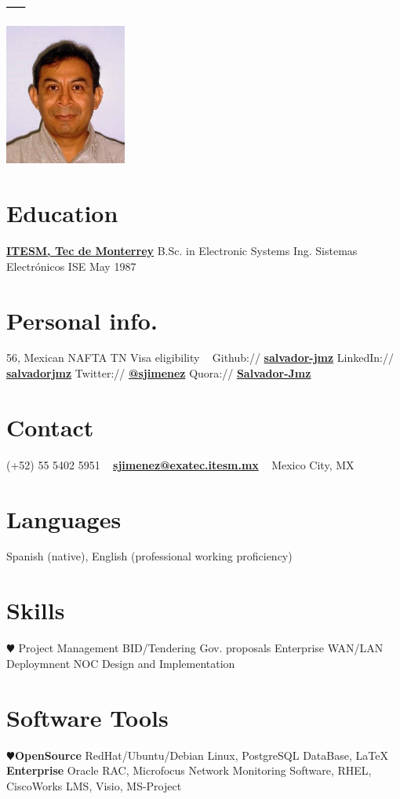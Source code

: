 \documentclass[espanol]{cv-style}     %
\begin{document}
\lastupdated

\begin{aside}
\section{\_}
\includegraphics[width=4cm]{SJS_2007.jpg}
%
\section{Education}
\href{https://tec.mx/en}{\bf ITESM, Tec de Monterrey}
B.Sc. in Electronic Systems
Ing. Sistemas Electrónicos ISE
May 1987 
%
\section{Personal info.}
56, Mexican
NAFTA TN Visa eligibility
~
Github:// \href{https://github.com/salvador-jmz}{\bf salvador-jmz} 
LinkedIn:// \href{https://www.linkedin.com/in/salvadorjmz}{\bf salvadorjmz} 
Twitter:// \href{https://twitter.com/sjimenez}{\bf @sjimenez} 
Quora:// \href{https://www.quora.com/Salvador-Jmz}{\bf Salvador-Jmz}
%
\section{Contact}
(+52) 55 5402 5951
~
\href{mailto:sjimenez@exatec.itesm.mx}{\bf sjimenez@exatec.itesm.mx}
~
Mexico City, MX
%
\section{Languages}
Spanish (native),
English (professional working proficiency)
%
\section{Skills}
{\color{red} $\varheartsuit$} Project Management
BID/Tendering Gov. proposals
Enterprise WAN/LAN Deploymnent
NOC Design and Implementation
%
\section{Software Tools}
{\color{red} $\varheartsuit$}{\bf OpenSource} RedHat/Ubuntu/Debian Linux, PostgreSQL DataBase, LaTeX
{\bf Enterprise}
Oracle RAC, Microfocus Network Monitoring Software, RHEL, CiscoWorks LMS, Visio, MS-Project
%
\end{aside}
\end{document}
